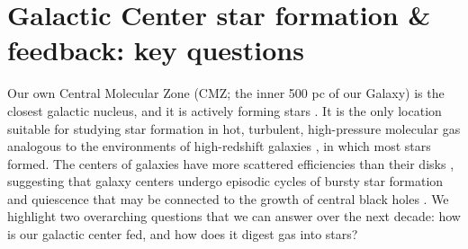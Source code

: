 \documentclass[modern]{aastex62}
\begin{document}
\clearpage

\section{Galactic Center star formation \& feedback: key questions}



Our own Central Molecular Zone (CMZ; the inner 500 pc of our Galaxy) is the
closest galactic nucleus, and it is actively forming stars \citep{Morris1996a}.
It is the only location suitable for studying star formation in hot, turbulent,
high-pressure  \citep{Ao2013a, Ginsburg2016a, Krieger2017a}
molecular gas analogous to the environments of high-redshift galaxies
\citep{Kruijssen2013a}, in which most stars formed. The centers of 
galaxies have more scattered efficiencies than their disks
\citep{Leroy2013a,Usero2015a,Bigiel2016a,Gallagher2018a}, suggesting that
galaxy centers undergo episodic cycles of bursty star formation and quiescence
that may be connected to the growth of central black holes
\citep[e.g.,][]{Kruijssen2014c,Krumholz2017a,Torrey2017c,Seo2019a}.
We highlight two overarching questions that we can answer over the next decade:
how is our galactic center fed, and how does it digest gas into stars?
\end{document}
